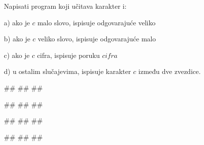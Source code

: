 \begin{Exercise}[label=p1.2_06] 
 Napisati program koji učitava karakter i:
 \begin{description}
\item{a)} ako je $c$ malo slovo, ispisuje odgovarajuće veliko
\item{b)} ako je $c$ veliko slovo, ispisuje odgovarajuće malo
\item{c)} ako je $c$ cifra, ispisuje poruku $cifra$
\item{d)} u ostalim slučajevima, ispisuje karakter $c$ između dve zvezdice.
\end{description}

\begin{miditest}
\begin{upotreba}{1}
#\naslovInt#
##
##
\end{upotreba}
\end{miditest}
\begin{miditest}
\begin{upotreba}{2}
#\naslovInt#
##
##
\end{upotreba}
\end{miditest}

\begin{miditest}
\begin{upotreba}{3}
#\naslovInt#
#\ulaz{>}#
#\izlaz{*>*}#
\end{upotreba}
\end{miditest}
\begin{miditest}
\begin{upotreba}{4}
#\naslovInt#
##
##
\end{upotreba}
\end{miditest}

\end{Exercise}
\ifresenja
 \begin{Answer}[ref=p1.2_06]
\end{Answer}
\fi


